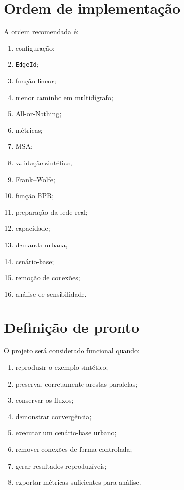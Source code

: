 \documentclass[12pt,a4paper]{article}
\begin{document}
\section{Ordem de implementação}

A ordem recomendada é:

\begin{enumerate}
    \item configuração;
    \item \texttt{EdgeId};
    \item função linear;
    \item menor caminho em multidígrafo;
    \item All-or-Nothing;
    \item métricas;
    \item MSA;
    \item validação sintética;
    \item Frank--Wolfe;
    \item função BPR;
    \item preparação da rede real;
    \item capacidade;
    \item demanda urbana;
    \item cenário-base;
    \item remoção de conexões;
    \item análise de sensibilidade.
\end{enumerate}

\section{Definição de pronto}

O projeto será considerado funcional quando:

\begin{enumerate}
    \item reproduzir o exemplo sintético;
    \item preservar corretamente arestas paralelas;
    \item conservar os fluxos;
    \item demonstrar convergência;
    \item executar um cenário-base urbano;
    \item remover conexões de forma controlada;
    \item gerar resultados reproduzíveis;
    \item exportar métricas suficientes para análise.
\end{enumerate}
\end{document}
